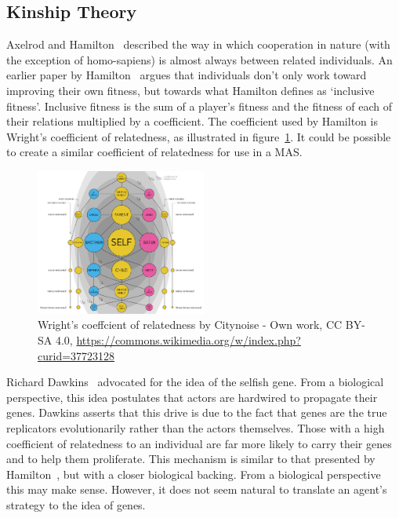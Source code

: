 \documentclass[]{final_report}
\begin{document}
\subsection{Kinship Theory}
\label{appendix:kin}
Axelrod and Hamilton~\cite{evolution_of_cooperation} described the way in which cooperation in nature (with the exception of homo-sapiens) is almost always between related individuals. An earlier paper by Hamilton~\cite{kinhamilton} argues that individuals don't only work toward improving their own fitness, but towards what Hamilton defines as `inclusive fitness'. Inclusive fitness is the sum of a player's fitness and the fitness of each of their relations multiplied by a coefficient. The coefficient used by Hamilton is Wright's coefficient of relatedness, as illustrated in figure~\ref{fig:coefrelate}. It could be possible to create a similar coefficient of relatedness for use in a MAS.
\begin{figure}
	\center
	\includegraphics[width=0.5\textwidth]{coefrelate.png}
	\caption{Wright's coeffcient of relatedness by Citynoise - Own work, CC BY-SA 4.0, \url{https://commons.wikimedia.org/w/index.php?curid=37723128}}
	\label{fig:coefrelate}
\end{figure}
\par
Richard Dawkins~\cite{selfish_gene} advocated for the idea of the selfish gene. From a biological perspective, this idea postulates that actors are hardwired to propagate their genes. Dawkins asserts that this drive is due to the fact that genes are the true replicators evolutionarily rather than the actors themselves. Those with a high coefficient of relatedness to an individual are far more likely to carry their genes and to help them proliferate. This mechanism is similar to that presented by Hamilton~\cite{kinhamilton}, but with a closer biological backing. From a biological perspective this may make sense. However, it does not seem natural to translate an agent's strategy to the idea of genes.\par
\end{document}
